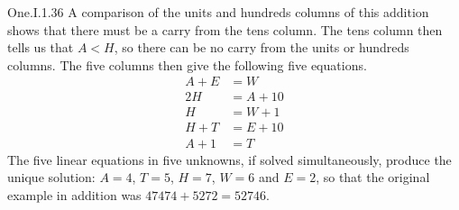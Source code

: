 \begin{ans}{One.I.1.36}
        \answerasgiven
        A comparison of the units and hundreds columns of this
        addition shows that there must be a carry from the tens column.
        The tens column then tells us that \( A<H \), so there
        can be no carry from the units or hundreds columns.
        The five columns then give the following five equations.
        \begin{align*}
          A+E  &=  W  \\
          2H   &=  A+10  \\
          H    &=  W+1  \\
          H+T  &=  E+10  \\
          A+1  &=  T
        \end{align*}
        The five linear equations in five unknowns, if solved simultaneously,
        produce the unique solution: \( A=4 \), \( T=5 \), \( H=7 \),
        \( W=6 \) and \( E=2 \), so that the original example in addition
        was \( 47474+5272=52746 \).
      
\end{ans}
